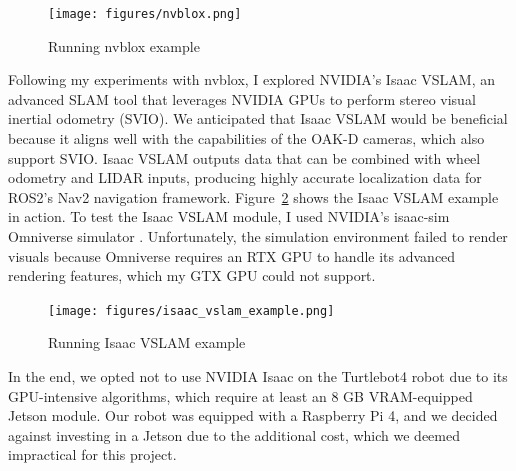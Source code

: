 \begin{figure}[htbp]
	\centering
	\texttt{[image: figures/nvblox.png]}
	\caption{Running nvblox example}
	\label{fig:nvblox_example}
\end{figure}

Following my experiments with nvblox, I explored NVIDIA's Isaac VSLAM, an advanced SLAM tool that leverages NVIDIA GPUs to perform stereo visual inertial odometry (SVIO). We anticipated that Isaac VSLAM would be beneficial because it aligns well with the capabilities of the OAK-D cameras, which also support SVIO. Isaac VSLAM outputs data that can be combined with wheel odometry and LIDAR inputs, producing highly accurate localization data for ROS2's Nav2 navigation framework. Figure~\ref{fig:isaac_vslam_example} shows the Isaac VSLAM example in action. To test the Isaac VSLAM module, I used NVIDIA's isaac-sim Omniverse simulator \cite{isaac_sim_docs}. Unfortunately, the simulation environment failed to render visuals because Omniverse requires an RTX GPU to handle its advanced rendering features, which my GTX GPU could not support.

\begin{figure}[htbp]
	\centering
	\texttt{[image: figures/isaac\_vslam\_example.png]}
	\caption{Running Isaac VSLAM example}
	\label{fig:isaac_vslam_example}
\end{figure}

In the end, we opted not to use NVIDIA Isaac on the Turtlebot4 robot due to its GPU-intensive algorithms, which require at least an 8 GB VRAM-equipped Jetson module. Our robot was equipped with a Raspberry Pi 4, and we decided against investing in a Jetson due to the additional cost, which we deemed impractical for this project.
